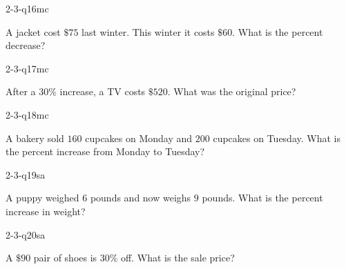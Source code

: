 \begin{practiceQuestion}{2-3-q16}{mc}
\begin{questionText}
A jacket cost $\$75$ last winter. This winter it costs $\$60$. What is the percent decrease?
\end{questionText}
\end{practiceQuestion}

\begin{practiceQuestion}{2-3-q17}{mc}
\begin{questionText}
After a $30\%$ increase, a TV costs $\$520$. What was the original price?
\end{questionText}
\end{practiceQuestion}

\begin{practiceQuestion}{2-3-q18}{mc}
\begin{questionText}
A bakery sold $160$ cupcakes on Monday and $200$ cupcakes on Tuesday. What is the percent increase from Monday to Tuesday?
\end{questionText}
\end{practiceQuestion}


\begin{practiceQuestion}{2-3-q19}{sa}
\begin{questionText}
A puppy weighed $6$ pounds and now weighs $9$ pounds. What is the percent increase in weight?
\end{questionText}
\end{practiceQuestion}

\begin{practiceQuestion}{2-3-q20}{sa}
\begin{questionText}
A $\$90$ pair of shoes is $30\%$ off. What is the sale price?
\end{questionText}
\end{practiceQuestion}

